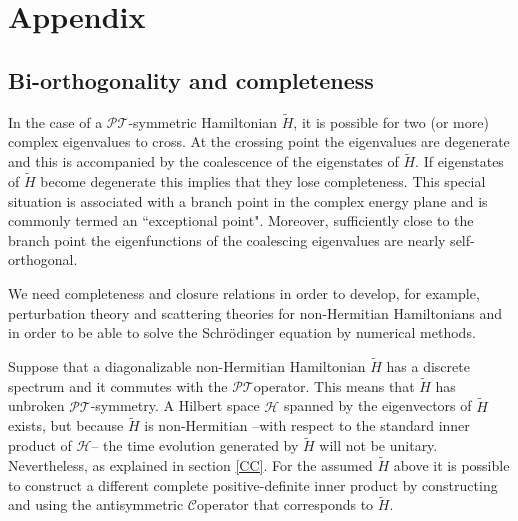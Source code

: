 \documentclass[12pt, a4paper]{report}
\newcommand\PT{\(\mathcal{PT}\)}
\newcommand\CC{\(\mathcal{C}\)}
\begin{document}

%


\chapter{Appendix}\label{appendix}

\section*{Bi-orthogonality and completeness}\label{}
In the case of a \PT-symmetric Hamiltonian $\tilde{H}$, it is possible for two (or more) complex eigenvalues to cross. At the crossing point the eigenvalues are degenerate and this is accompanied by the coalescence of the eigenstates of $\tilde{H}$. If eigenstates of $\tilde{H}$ become degenerate this implies that they lose completeness\cite{Brody_2013}. This special situation is associated with a branch point in the complex energy plane and is commonly termed an ``exceptional point"\cite{Moiseyev}. Moreover, sufficiently close to the branch point the eigenfunctions of the coalescing eigenvalues are nearly self-orthogonal.

We need completeness and closure relations in order to develop, for example, perturbation theory and scattering theories for non-Hermitian Hamiltonians and in order to be able to solve the Schrödinger equation by numerical methods\cite{Moiseyev}.

Suppose that a diagonalizable non-Hermitian Hamiltonian $\tilde{H}$ has a discrete spectrum and it commutes with the \PT\:operator.  This means that  $\tilde{H}$ has unbroken \PT-symmetry. A Hilbert space $\mathcal{H}$ spanned by the eigenvectors of $\tilde{H}$ exists, but because $\tilde{H}$ is non-Hermitian --with respect to the standard inner product of $\mathcal{H}$-- the time evolution generated by $\tilde{H}$ will not be unitary\cite{Mostafazadeh}. Nevertheless, as explained in section \ref{CC}. For the assumed $\tilde{H}$ above it is possible to construct a different complete positive-definite inner product by constructing and using the antisymmetric \CC\:operator that corresponds to $\tilde{H}$.
\end{document}
